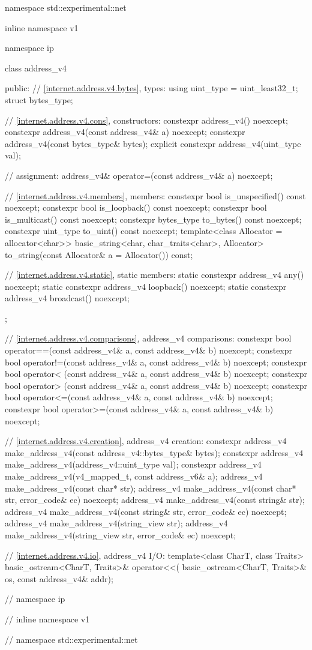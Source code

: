 %
\begin{codeblock}
namespace std::experimental::net {
inline namespace v1 {
namespace ip {

  class address_v4
  {
  public:
    // \ref{internet.address.v4.bytes}, types:
    using uint_type = uint_least32_t;
    struct bytes_type;

    // \ref{internet.address.v4.cons}, constructors:
    constexpr address_v4() noexcept;
    constexpr address_v4(const address_v4& a) noexcept;
    constexpr address_v4(const bytes_type& bytes);
    explicit constexpr address_v4(uint_type val);

    // assignment:
    address_v4& operator=(const address_v4& a) noexcept;

    // \ref{internet.address.v4.members}, members:
    constexpr bool is_unspecified() const noexcept;
    constexpr bool is_loopback() const noexcept;
    constexpr bool is_multicast() const noexcept;
    constexpr bytes_type to_bytes() const noexcept;
    constexpr uint_type to_uint() const noexcept;
    template<class Allocator = allocator<char>>
      basic_string<char, char_traits<char>, Allocator>
        to_string(const Allocator& a = Allocator()) const;

    // \ref{internet.address.v4.static}, static members:
    static constexpr address_v4 any() noexcept;
    static constexpr address_v4 loopback() noexcept;
    static constexpr address_v4 broadcast() noexcept;
  };

  // \ref{internet.address.v4.comparisons}, address_v4 comparisons:
  constexpr bool operator==(const address_v4& a, const address_v4& b) noexcept;
  constexpr bool operator!=(const address_v4& a, const address_v4& b) noexcept;
  constexpr bool operator< (const address_v4& a, const address_v4& b) noexcept;
  constexpr bool operator> (const address_v4& a, const address_v4& b) noexcept;
  constexpr bool operator<=(const address_v4& a, const address_v4& b) noexcept;
  constexpr bool operator>=(const address_v4& a, const address_v4& b) noexcept;

  // \ref{internet.address.v4.creation}, address_v4 creation:
  constexpr address_v4 make_address_v4(const address_v4::bytes_type& bytes);
  constexpr address_v4 make_address_v4(address_v4::uint_type val);
  constexpr address_v4 make_address_v4(v4_mapped_t, const address_v6& a);
  address_v4 make_address_v4(const char* str);
  address_v4 make_address_v4(const char* str, error_code& ec) noexcept;
  address_v4 make_address_v4(const string& str);
  address_v4 make_address_v4(const string& str, error_code& ec) noexcept;
  address_v4 make_address_v4(string_view str);
  address_v4 make_address_v4(string_view str, error_code& ec) noexcept;

  // \ref{internet.address.v4.io}, address_v4 I/O:
  template<class CharT, class Traits>
    basic_ostream<CharT, Traits>& operator<<(
      basic_ostream<CharT, Traits>& os, const address_v4& addr);

} // namespace ip
} // inline namespace v1
} // namespace std::experimental::net
\end{codeblock}

